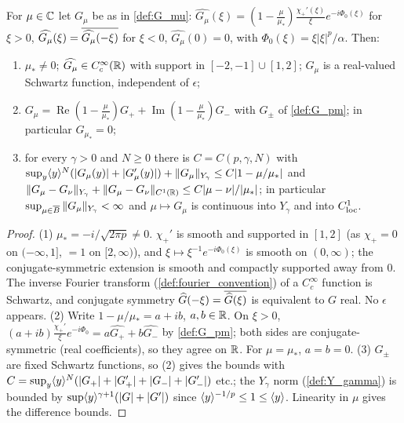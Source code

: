\begin{lemma}[Properties of $G_\mu$]
  \label{lem:c07_G_mu_properties}
  For $\mu\in\mathbb{C}$ let $G_\mu$ be as in \cref{def:G_mu}:
  $\widehat{G_\mu}(\xi)=(1-\frac\mu{\mu_*})\frac{\chi_+'(\xi)}{\xi}e^{-i\Phi_0(\xi)}$ for $\xi>0$,
  $\widehat{G_\mu}(\xi)=\overline{\widehat{G_\mu}(-\xi)}$ for $\xi<0$, $\widehat{G_\mu}(0)=0$, with
  $\Phi_0(\xi)=\xi|\xi|^p/\alpha$. Then:
  \begin{enumerate}
    \item $\mu_*\ne0$; $\widehat{G_\mu}\in C_c^\infty(\mathbb{R})$ with support in $[-2,-1]\cup[1,2]$; $G_\mu$ is a
      real-valued Schwartz function, independent of $\epsilon$;
    \item $G_\mu=\operatorname{Re}(1-\frac\mu{\mu_*})G_++\operatorname{Im}(1-\frac\mu{\mu_*})G_-$ with $G_\pm$ of
      \cref{def:G_pm}; in particular $G_{\mu_*}=0$;
    \item for every $\gamma>0$ and $N\geq0$ there is $C=C(p,\gamma,N)$ with
      $\sup_y\langle y \rangle^{N}(|G_\mu(y)|+|G_\mu'(y)|)+\|G_\mu\|_{Y_\gamma}\le C|1-\mu/\mu_*|$ and
      $\|G_\mu-G_\nu\|_{Y_\gamma}+\|G_\mu-G_\nu\|_{C^1(\mathbb{R})}\le C|\mu-\nu|/|\mu_*|$; in particular
      $\sup_{\mu\in\overline{B}}\|G_\mu\|_{Y_\gamma}<\infty$ and $\mu\mapsto G_\mu$ is continuous into $Y_\gamma$ and into $C^1_{\textup{loc}}$.
  \end{enumerate}
\end{lemma}
\begin{proof}
  (1) $\mu_*=-i/\sqrt{2\pi p}\neq0$. $\chi_+'$ is smooth and supported in $[1,2]$ (as $\chi_+=0$ on
  $(-\infty,1]$, $=1$ on $[2,\infty)$), and $\xi\mapsto\xi^{-1}e^{-i\Phi_0(\xi)}$ is smooth on $(0,\infty)$;
  the conjugate-symmetric extension is smooth and compactly supported away from $0$. The inverse
  Fourier transform (\cref{def:fourier_convention}) of a $C_c^\infty$ function is Schwartz, and conjugate
  symmetry $\widehat G(-\xi)=\overline{\widehat G(\xi)}$ is equivalent to $G$ real. No $\epsilon$ appears.
  (2) Write $1-\mu/\mu_*=a+ib$, $a,b\in\mathbb{R}$. On $\xi>0$, $(a+ib)\frac{\chi_+'}{\xi}e^{-i\Phi_0}=a\widehat{G_+}+b\widehat{G_-}$
  by \cref{def:G_pm}; both sides are conjugate-symmetric (real coefficients), so they agree on $\mathbb{R}$.
  For $\mu=\mu_*$, $a=b=0$. (3) $G_\pm$ are fixed Schwartz functions, so (2) gives the bounds
  with $C=\sup_y\langle y \rangle^{N}(|G_+|+|G_+'|+|G_-|+|G_-'|)$ etc.; the $Y_\gamma$ norm (\cref{def:Y_gamma}) is
  bounded by $\sup\langle y \rangle^{\gamma+1}(|G|+|G'|)$ since $\langle y \rangle^{-1/p}\le 1\le\langle y \rangle$. Linearity in $\mu$ gives the difference bounds.
\end{proof}

